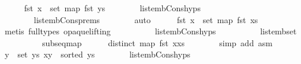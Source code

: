 \begin{isabellebody}
\ \ \ \ \isamarkupfalse%
\ {\isachardoublequoteopen}fst\ x\ {\isasymnotin}\ set\ {\isacharparenleft}{\kern0pt}map\ fst\ ys{\isacharparenright}{\kern0pt}{\isachardoublequoteclose}\isanewline
\ \ \ \ \ \ \isamarkupfalse%
\ list{\isacharunderscore}{\kern0pt}emb{\isacharunderscore}{\kern0pt}Cons{}{\isachardot}{\kern0pt}hyps{\isacharparenleft}{\kern0pt}{}{\isacharparenright}{\kern0pt}\isanewline
\ \ \ \ \ \ \ \ list{\isacharunderscore}{\kern0pt}emb{\isacharunderscore}{\kern0pt}Cons{}{\isachardot}{\kern0pt}prems\isanewline
\ \ \ \ \ \ \isamarkupfalse%
\ auto\isanewline
\ \ \ \ \isamarkupfalse%
\ {\isachardoublequoteopen}fst\ x\ {\isasymnotin}\ set\ {\isacharparenleft}{\kern0pt}map\ fst\ xs{\isacharparenright}{\kern0pt}{\isachardoublequoteclose}\isanewline
\ \ \ \ \ \ \isamarkupfalse%
\ {\isacharparenleft}{\kern0pt}metis\ {\isacharparenleft}{\kern0pt}full{\isacharunderscore}{\kern0pt}types{\isacharcomma}{\kern0pt}\ opaque{\isacharunderscore}{\kern0pt}lifting{\isacharparenright}{\kern0pt}\isanewline
\ \ \ \ \ \ \ \ \ \ list{\isacharunderscore}{\kern0pt}emb{\isacharunderscore}{\kern0pt}Cons{}{\isachardot}{\kern0pt}hyps{\isacharparenleft}{\kern0pt}{}{\isacharparenright}{\kern0pt}\isanewline
\ \ \ \ \ \ \ \ \ \ list{\isacharunderscore}{\kern0pt}emb{\isacharunderscore}{\kern0pt}set\isanewline
\ \ \ \ \ \ \ \ \ \ subseq{\isacharunderscore}{\kern0pt}map{\isacharparenright}{\kern0pt}\isanewline
\ \ \ \ \isamarkupfalse%
\ {}{\isacharcolon}{\kern0pt}{\isachardoublequoteopen}distinct\ {\isacharparenleft}{\kern0pt}map\ fst\ {\isacharparenleft}{\kern0pt}x{\isacharhash}{\kern0pt}xs{\isacharparenright}{\kern0pt}{\isacharparenright}{\kern0pt}{\isachardoublequoteclose}\isanewline
\ \ \ \ \ \ \isamarkupfalse%
\ {\isacharparenleft}{\kern0pt}simp\ add{\isacharcolon}{\kern0pt}\ asm{\isacharparenleft}{\kern0pt}{}{\isacharparenright}{\kern0pt}{\isacharparenright}{\kern0pt}\isanewline
\ \ \ \ \isamarkupfalse%
\ {\isachardoublequoteopen}{\isacharparenleft}{\kern0pt}{\isacharparenleft}{\kern0pt}{\isasymforall}y\ {\isasymin}\ set\ ys{\isachardot}{\kern0pt}\ x{\isasymle}y{\isacharparenright}{\kern0pt}\ {\isasymand}\ sorted\ ys{\isacharparenright}{\kern0pt}{\isachardoublequoteclose}\isanewline
\ \ \ \ \ \ \isamarkupfalse%
\ list{\isacharunderscore}{\kern0pt}emb{\isacharunderscore}{\kern0pt}Cons{}{\isachardot}{\kern0pt}hyps{\isacharparenleft}{\kern0pt}{}{\isacharparenright}{\kern0pt}\isanewline

\end{isabellebody}
